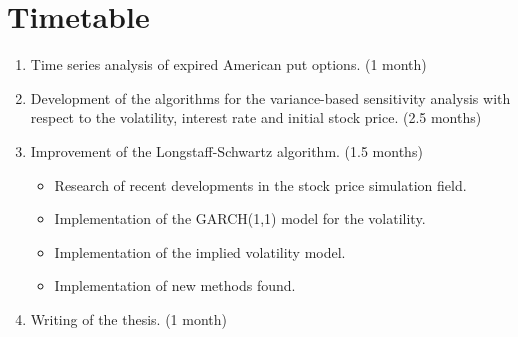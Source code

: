 \documentclass[a4paper,twocolumn,aps,prd,longbibliography,superscriptaddress]{revtex4-1}
\begin{document}
\section{Timetable}
\begin{enumerate}
\item Time series analysis of expired American put options. (1 month)
\item Development of the algorithms for the variance-based sensitivity analysis with respect to the volatility, interest rate and initial stock price. (2.5 months)
\item Improvement of the Longstaff-Schwartz algorithm. (1.5 months)
\begin{itemize}
\item Research of recent developments in the stock price simulation field.
\item Implementation of the GARCH(1,1) model for the volatility.
\item Implementation of the implied volatility model.
\item Implementation of new methods found.
\end{itemize}
\item Writing of the thesis. (1 month)
\end{enumerate}




\end{document}
